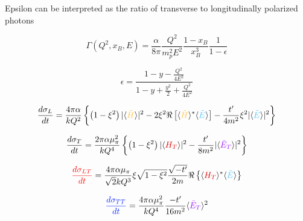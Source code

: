             Epsilon can be interpreted as the ratio of transverse to longitudinally polarized photons
    
    
            \begin{equation}\label{eq:virtualphotonflux}
                         \Gamma (Q^2, x_B, E) = \frac{\alpha}{8\pi} \frac{Q^2}{m^2_pE^2}\frac{1-x_B}{x_B^3}\frac{1}{1-\epsilon}
            \end{equation}
        
            \begin{equation}\label{eq:virtualphotonpolarization}
                \epsilon = \frac{1 - y - \frac{Q^2}{4E^2}}{1 - y + \frac{y^2}{2} + \frac{Q^2}{4E^2}}
            \end{equation}\label{Virtual Photon Polarization}
        
         \begin{equation}\label{eq:sigmaL}
                 \textcolor{sigmaL}{\frac{d\sigma_{L}}{dt}} = 
                \frac{4\pi\alpha}{kQ^2}\left\{ \left( 1 - \xi^2 \right) 
                \lvert \langle \GPDHtildeEQ \rangle \rvert ^2 
                -2\xi^2 \Re \left[  \langle \GPDHtildeEQ \rangle ^* \langle \GPDEtildeEQ \rangle    \right] - \frac{t'}{4m^2}\xi^2
                \lvert \langle \GPDEtildeEQ \rangle \rvert ^2  \right\}
            \end{equation} 
        
            \begin{equation}\label{eq:sigmaT}
                \textcolor{sigmaT}{\frac{d\sigma_{T}}{dt}} = 
                \frac{2\pi\alpha \mu_{\pi}^2}{kQ^4}
                \left\{ \left( 1 - \xi^2 \right) 
                \lvert \langle \GPDHTEQ \rangle \rvert ^2
                - \frac{t'}{8m^2}
                \lvert \langle \GPDETbarEQ \rangle \rvert ^2  \right\}    
            \end{equation} 
            
            \begin{equation}\label{eq:sigmaLT}
                \textcolor{sigmaLT}{\frac{d\sigma_{LT}}{dt}} = 
                \frac{4\pi\alpha \mu_{\pi}}{\sqrt{2}kQ^3}
                \xi\sqrt{1-\xi^2}
                \frac{\sqrt{-t'}}{2m}
                \Re \left\{ 
                 \langle \GPDHTEQ \rangle ^*
                \langle \GPDEtildeEQ \rangle   
                \right\}
             \end{equation} 
            
            
            \begin{equation}\label{eq:sigmaTT}
                \textcolor{sigmaTT}{\frac{d\sigma_{TT}}{dt}} = 
                \frac{4\pi\alpha \mu_{\pi}^2}{kQ^4}
                \frac{-t'}{16m^2}
                \langle \GPDETbarEQ \rangle^2   
            \end{equation} 
        
